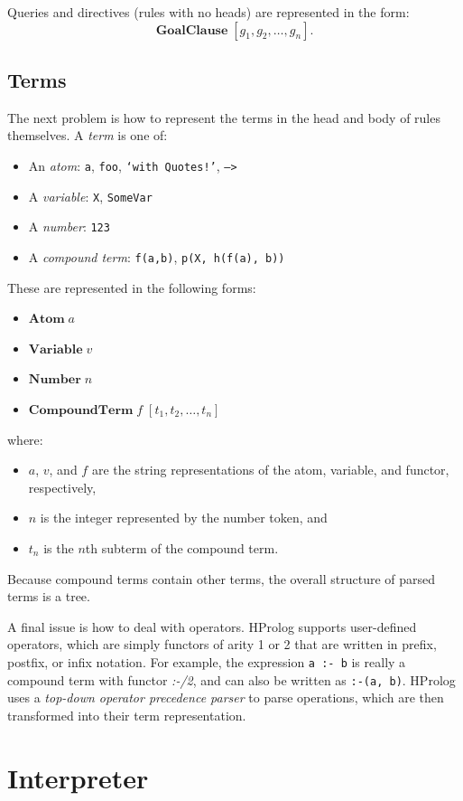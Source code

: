 \documentclass[11pt]{report}
\begin{document}
Queries and directives (rules with no heads) are represented in the form:
\[
\mathbf{GoalClause} \; [g_1, g_2, \ldots, g_n].
\]

\subsection{Terms}

The next problem is how to represent the terms in the head and body of rules themselves. A \emph{term} is one of:
\begin{itemize}
\item An \emph{atom}: \texttt{a}, \texttt{foo}, \texttt{`with Quotes!'}, \texttt{-->}
\item A \emph{variable}: \texttt{X}, \texttt{SomeVar}
\item A \emph{number}: \texttt{123}
\item A \emph{compound term}: \texttt{f(a,b)}, \texttt{p(X, h(f(a), b))}
\end{itemize}
These are represented in the following forms:
\begin{itemize}
\item $ \mathbf{Atom}\; a $
\item $ \mathbf{Variable}\; v $
\item $ \mathbf{Number}\; n $
\item $ \mathbf{CompoundTerm}\; f \; [t_1, t_2, \ldots, t_n] $
\end{itemize}
where:
\begin{itemize}
\item $a$, $v$, and $f$ are the string representations of the atom, variable, and functor, respectively,
\item $n$ is the integer represented by the number token, and
\item $t_n$ is the $n$th subterm of the compound term.
\end{itemize}
Because compound terms contain other terms, the overall structure of parsed terms is a tree.

A final issue is how to deal with operators. HProlog supports user-defined operators, which are simply functors of arity 1 or 2 that are written in prefix, postfix, or infix notation. For example, the expression \texttt{a :- b} is really a compound term with functor \emph{:-/2}, and can also be written as \texttt{:-(a, b)}. HProlog uses a \emph{top-down operator precedence parser} to parse operations, which are then transformed into their term representation.


\section{Interpreter}
\end{document}

